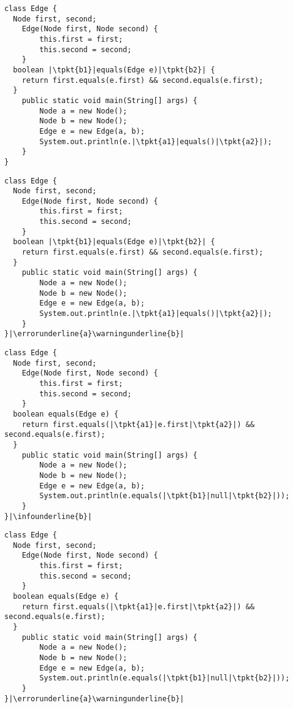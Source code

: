 \newsavebox{\codeone}
\begin{lrbox}{\codeone}
\begin{lstlisting}
class Edge {
  Node first, second;
	Edge(Node first, Node second) {
		this.first = first;
		this.second = second;
	}
  boolean |\tpkt{b1}|equals(Edge e)|\tpkt{b2}| {
    return first.equals(e.first) && second.equals(e.first);
  }
	public static void main(String[] args) {
		Node a = new Node();
		Node b = new Node();
		Edge e = new Edge(a, b);
		System.out.println(e.|\tpkt{a1}|equals()|\tpkt{a2}|);
	}
}
\end{lstlisting}
\end{lrbox}

\newsavebox{\bugone}
\begin{lrbox}{\bugone}
\begin{lstlisting}
class Edge {
  Node first, second;
	Edge(Node first, Node second) {
		this.first = first;
		this.second = second;
	}
  boolean |\tpkt{b1}|equals(Edge e)|\tpkt{b2}| {
    return first.equals(e.first) && second.equals(e.first);
  }
	public static void main(String[] args) {
		Node a = new Node();
		Node b = new Node();
		Edge e = new Edge(a, b);
		System.out.println(e.|\tpkt{a1}|equals()|\tpkt{a2}|);
	}
}|\errorunderline{a}\warningunderline{b}|
\end{lstlisting}
\end{lrbox}

\newsavebox{\codetwo}
\begin{lrbox}{\codetwo}
\begin{lstlisting}
class Edge {
  Node first, second;
	Edge(Node first, Node second) {
		this.first = first;
		this.second = second;
	}
  boolean equals(Edge e) {
    return first.equals(|\tpkt{a1}|e.first|\tpkt{a2}|) && second.equals(e.first);
  }
	public static void main(String[] args) {
		Node a = new Node();
		Node b = new Node();
		Edge e = new Edge(a, b);
		System.out.println(e.equals(|\tpkt{b1}|null|\tpkt{b2}|));
	}
}|\infounderline{b}|
\end{lstlisting}
\end{lrbox}

\newsavebox{\bugtwo}
\begin{lrbox}{\bugtwo}
\begin{lstlisting}
class Edge {
  Node first, second;
	Edge(Node first, Node second) {
		this.first = first;
		this.second = second;
	}
  boolean equals(Edge e) {
    return first.equals(|\tpkt{a1}|e.first|\tpkt{a2}|) && second.equals(e.first);
  }
	public static void main(String[] args) {
		Node a = new Node();
		Node b = new Node();
		Edge e = new Edge(a, b);
		System.out.println(e.equals(|\tpkt{b1}|null|\tpkt{b2}|));
	}
}|\errorunderline{a}\warningunderline{b}|
\end{lstlisting}
\end{lrbox}

